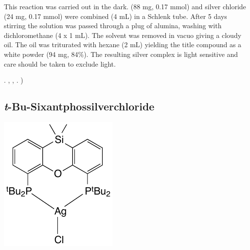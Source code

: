 This reaction was carried out in the dark.   (88 mg, 0.17 mmol) and silver chloride (24 mg, 0.17 mmol) were combined  (4 mL) in a Schlenk tube.  After 5 days stirring the solution was passed through a plug of alumina, washing with dichloromethane (4 x 1 mL).  The solvent was removed in vacuo giving a cloudy oil.  The oil was triturated with hexane (2 mL) yielding the title compound as a white powder (94 mg, 84\%).  The resulting silver complex is light sensitive and care should be taken to exclude light.


.
,
,
.
)
 
 


\subsection*{\emph{t}-Bu-Sixantphossilverchloride} 
\begin{structure}[h]
\begin{center}
\includegraphics{../Structures/SitBuSilverChloride.pdf}
\end{center}
\end{structure}

